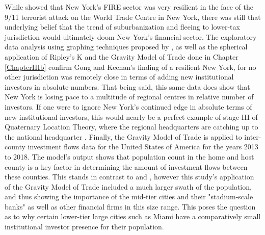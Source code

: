 While \cite{gongthe2012} showed that New York's FIRE sector was very resilient in the face of the 9/11 terrorist attack on the World Trade Centre in New York, there was still that underlying belief that the trend of suburbanization and fleeing to lower-tax jurisdiction would ultimately doom New York's financial sector.  The exploratory data analysis using graphing techniques proposed by  \cite{tufte1998visual}, as well as the spherical application of Ripley's K and the Gravity Model of Trade done in Chapter \ref{ChapterIIIb} confirm Gong and Keenan's finding of a resilient New York, for no other jurisdiction was remotely close in terms of adding new institutional investors in absolute numbers. That being said, this same data does show that New York is losing pace to a multitude of regional centres in relative number of investors.  If one were to ignore New York's continued edge in absolute terms of new institutional investors, this would nearly be a perfect example of stage III of Quaternary Location Theory, where the regional headquarters are catching up to the national headquarter \citep{Semple_Phipps82}.  Finally, the Gravity Model of Trade is applied to inter-county investment flows data for the United States of America for the years 2013 to 2018.  The model's output shows that population count in the home and host county is a key factor in determining the amount of investment flows between these counties.  This stands in contrast to \cite{greena1993} and \cite{GreenOLef2014}, however this study's application of the Gravity Model of Trade included a much larger swath of the population, and thus showing the importance of the mid-tier cities and their "stadium-scale banks" as well as other financial firms in this size range. This poses the question as to why certain lower-tier large cities such as Miami have a comparatively small institutional investor presence for their population.  


